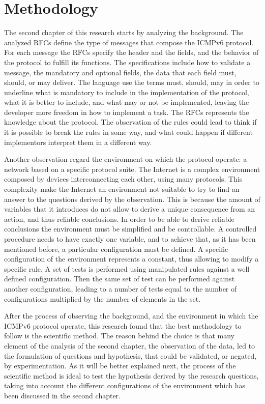 \documentclass[12pt]{article}
\begin{document}
\pagebreak

\section{Methodology}
\label{sec:3}

The second chapter of this research starts by analyzing the background. The analyzed RFCs define the type of messages that compose the ICMPv6 protocol. For each message the RFCs specify the header and the fields, and the behavior of the protocol to fulfill its functions. The specifications include how to validate a message, the mandatory and optional fields, the data that each field must, should, or may deliver. The language use the terms must, should, may in order to underline what is mandatory to include in the implementation of the protocol, what it is better to include, and what may or not be implemented, leaving the developer more freedom in how to implement a task. The RFCs represents the knowledge about the protocol. The observation of the rules could lead to think if it is possible to break the rules in some way, and what could happen if different implementors interpret them in a different way.

Another observation regard the environment on which the protocol operate: a network based on a specific protocol suite. The Internet is a complex environment composed by devices interconnecting each other, using many protocols. This complexity make the Internet an environment not suitable to try to find an answer to the questions derived by the observation. This is because the amount of variables that it introduces do not allow to derive a unique consequence from an action, and thus reliable conclusions. In order to be able to derive reliable conclusions the environment must be simplified and be controllable. A controlled procedure needs to have exactly one variable, and to achieve that, as it has been mentioned before, a particular configuration must be defined. A specific configuration of the environment represents a constant, thus allowing to modify a specific rule. A set of tests is performed using manipulated rules against a well defined configuration. Then the same set of test can be performed against another configuration, leading to a number of tests equal to the number of configurations multiplied by the number of elements in the set.\cite{secExperiments}

After the process of observing the background, and the environment in which the ICMPv6 protocol operate, this research found that the best methodology to follow is the scientific method. The reason behind the choice is that many element of the analysis of the second chapter, the observation of the data, led to the formulation of questions and hypothesis, that could be validated, or negated, by experimentation. As it will be better explained next, the process of the scientific method is ideal to test the hypothesis derived by the research questions, taking into account the different configurations of the environment which has been discussed in the second chapter.
\end{document}
